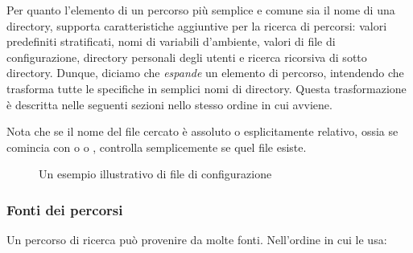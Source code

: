 \documentclass{article}
\begin{document}
Per quanto l'elemento di un percorso più semplice e comune sia il nome di
una directory, \KPS{} supporta caratteristiche aggiuntive per la ricerca
di percorsi: valori predefiniti stratificati, nomi di variabili
d'ambiente, valori di file di configurazione, directory personali degli
utenti e ricerca ricorsiva di sotto directory. Dunque, diciamo che \KPS{}
\emph{espande} un elemento di percorso, intendendo che trasforma tutte le
specifiche in semplici nomi di directory. Questa trasformazione è
descritta nelle seguenti sezioni nello stesso ordine in cui avviene.

Nota che se il nome del file cercato è assoluto o esplicitamente relativo,
ossia se comincia con \samp{/} o  o , \KPS{} controlla
semplicemente se quel file esiste.

\ifSingleColumn
\else
\begin{figure*}

\setlength{\abovecaptionskip}{0pt}
  \caption{Un esempio illustrativo di file di configurazione}
  \label{fig:config-sample}
\end{figure*}
\fi

\subsubsection{Fonti dei percorsi}
\label{sec:path-sources}

Un percorso di ricerca può provenire da molte fonti. Nell'ordine in cui
\KPS{} le usa:
\end{document}
